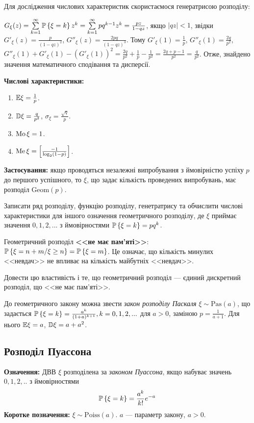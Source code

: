 Для дослідження числових характеристик скористаємося генератрисою розподілу:

$G_\xi(z) = \sum\limits_{k=1}^{\infty} \P\left\{\xi = k\right\} z^k = \sum\limits_{k=1}^{\infty} pq^{k-1} z^k = \frac{pz}{1-qz}$, якщо $\left| qz\right|<1$, звідки
$G'_\xi(z) = \frac{p}{(1-qz)^2}$, $G''_\xi(z) = \frac{2pq}{(1-qz)^3}$. Тому
$G'_\xi(1) = \frac{1}{p}$, $G''_\xi(1) = \frac{2q}{p^2}$, $G''_\xi(1) + G'_\xi(1) - \left( G'_\xi(1)\right)^2 = \frac{2q}{p^2} + \frac{1}{p} - \frac{1}{p^2} = \frac{2q+p-1}{p^2} = \frac{q}{p^2}$.
Отже, знайдено значення математичного сподівання та дисперсії.

\noindent\textbf{Числові характеристики:}
\begin{enumerate}
    \item $\E\xi = \frac{1}{p}$.
    \item $\D\xi = \frac{q}{p^2}$, $\sigma_\xi = \frac{\sqrt{q}}{p}$.
    \item $\Mo\xi = 1$.
    \item $\Me\xi = \left[ \frac{-1}{\log_2(1-p)}\right]$.
\end{enumerate}

\noindent\textbf{Застосування:} якщо проводяться незалежні випробування з ймовірністю успіху $p$ до першого успішного,
    то $\xi$, що задає кількість проведених випробувань, має розподіл $\mathrm{Geom}(p)$.

\begin{exercise}
    Записати ряд розподілу, функцію розподілу, генетратрису та обчислити
    числові характеристики для іншого означення геометричного розподілу, 
    де $\xi$ приймає значення $0,1,2,...$ з ймовірностями $\P\left\{\xi = k\right\} = pq^k$.
\end{exercise}
Геометричний розподіл \textbf{<<не має пам'яті>>}: $\P\left\{\xi = n+m / \xi \geq n\right\} = \P\left\{\xi = m\right\}$.
Це означає, що кількість минулих <<невдач>> не впливає на кількість майбутніх <<невдач>>.
\begin{exercise}
    Довести цю властивість і те, що геометричний розподіл --- 
    єдиний дискретний розподіл, що <<не має пам'яті>>.
\end{exercise}
До геометричного закону можна звести \emph{закон розподілу Паскаля} $\xi \sim \mathrm{Pas}(a)$,
що задається $\P\left\{\xi = k\right\} = \frac{a^k}{(1+a)^{k+1}}, k = 0,1,2,...$ для $a>0$,
заміною $p=\frac{1}{a+1}$. Для нього $\E\xi = a$, $\D\xi = a + a^2$.

\subsection{Розподіл Пуассона}
\noindent\textbf{Означення:}
    ДВВ $\xi$ розподілена за \emph{законом Пуассона}, 
    якщо набуває значень $0,1,2,..$ з ймовірностями \begin{equation}
        \P\left\{\xi = k\right\} = \frac{a^k}{k!}e^{-a}
    \end{equation}
    \textbf{Коротке позначення:} $\xi \sim \mathrm{Poiss}(a)$.
    $a$ --- параметр закону, $a > 0$.

